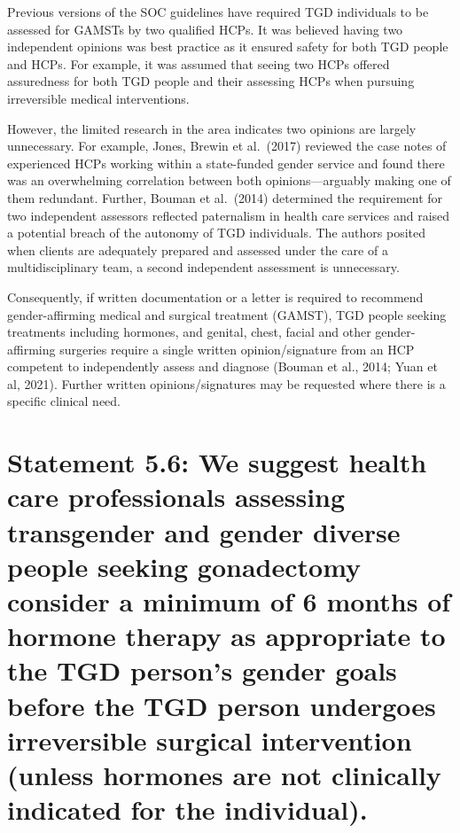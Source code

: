 \documentclass[
]{book}
\begin{document}
Previous versions of the SOC guidelines have
required TGD individuals to be assessed for
GAMSTs by two qualified HCPs. It was believed
having two independent opinions was best practice as it ensured safety for both TGD people
and HCPs. For example, it was assumed that
seeing two HCPs offered assuredness for both
TGD people and their assessing HCPs when pursuing irreversible medical interventions.

However, the limited research in the area indicates two opinions are largely unnecessary. For
example, Jones, Brewin et al.~(2017) reviewed the
case notes of experienced HCPs working within
a state-funded gender service and found there
was an overwhelming correlation between both
opinions---arguably making one of them redundant. Further, Bouman et al.~(2014) determined
the requirement for two independent assessors
reflected paternalism in health care services and
raised a potential breach of the autonomy of TGD
individuals. The authors posited when clients are
adequately prepared and assessed under the care
of a multidisciplinary team, a second independent
assessment is unnecessary.

Consequently, if written documentation or a
letter is required to recommend gender-affirming
medical and surgical treatment (GAMST), TGD
people seeking treatments including hormones, and
genital, chest, facial and other gender-affirming
surgeries require a single written opinion/signature
from an HCP competent to independently assess
and diagnose (Bouman et al., 2014; Yuan et al,
2021). Further written opinions/signatures may be
requested where there is a specific clinical need.

\hypertarget{statement-5.6-we-suggest-health-care-professionals-assessing-transgender-and-gender-diverse-people-seeking-gonadectomy-consider-a-minimum-of-6-months-of-hormone-therapy-as-appropriate-to-the-tgd-persons-gender-goals-before-the-tgd-person-undergoes-irreversible-surgical-intervention-unless-hormones-are-not-clinically-indicated-for-the-individual.}{%
\section*{Statement 5.6: We suggest health care professionals assessing transgender and gender diverse people seeking gonadectomy consider a minimum of 6 months of hormone therapy as appropriate to the TGD person's gender goals before the TGD person undergoes irreversible surgical intervention (unless hormones are not clinically indicated for the individual).}\label{statement-5.6-we-suggest-health-care-professionals-assessing-transgender-and-gender-diverse-people-seeking-gonadectomy-consider-a-minimum-of-6-months-of-hormone-therapy-as-appropriate-to-the-tgd-persons-gender-goals-before-the-tgd-person-undergoes-irreversible-surgical-intervention-unless-hormones-are-not-clinically-indicated-for-the-individual.}}
\end{document}
